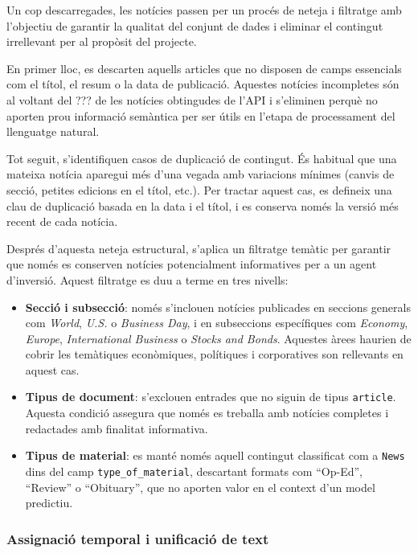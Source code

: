 \documentclass[12pt,a4paper,twoside]{book}
\begin{document}
Un cop descarregades, les notícies passen per un procés de neteja i filtratge amb l'objectiu de garantir la qualitat del conjunt de dades i eliminar el contingut irrellevant per al propòsit del projecte.

En primer lloc, es descarten aquells articles que no disposen de camps essencials com el títol, el resum o la data de publicació. Aquestes notícies incompletes són al voltant del ??? de les notícies obtingudes de l'API i s'eliminen perquè no aporten prou informació semàntica per ser útils en l'etapa de processament del llenguatge natural.

Tot seguit, s'identifiquen casos de duplicació de contingut. És habitual que una mateixa notícia aparegui més d'una vegada amb variacions mínimes (canvis de secció, petites edicions en el títol, etc.). Per tractar aquest cas, es defineix una clau de duplicació basada en la data i el títol, i es conserva només la versió més recent de cada notícia.

Després d'aquesta neteja estructural, s'aplica un filtratge temàtic per garantir que només es conserven notícies potencialment informatives per a un agent d'inversió. Aquest filtratge es duu a terme en tres nivells:

\begin{itemize}
    \item \textbf{Secció i subsecció}: només s'inclouen notícies publicades en seccions generals com \textit{World}, \textit{U.S.} o \textit{Business Day}, i en subseccions específiques com \textit{Economy}, \textit{Europe}, \textit{International Business} o \textit{Stocks and Bonds}. Aquestes àrees haurien de cobrir les temàtiques econòmiques, polítiques i corporatives son rellevants en aquest cas.

    \item \textbf{Tipus de document}: s'exclouen entrades que no siguin de tipus \texttt{article}. Aquesta condició assegura que només es treballa amb notícies completes i redactades amb finalitat informativa.

    \item \textbf{Tipus de material}: es manté només aquell contingut classificat com a \texttt{News} dins del camp \texttt{type\_of\_material}, descartant formats com “Op-Ed”, “Review” o “Obituary”, que no aporten valor en el context d'un model predictiu.
\end{itemize}


\subsubsection*{Assignació temporal i unificació de text}
\end{document}
